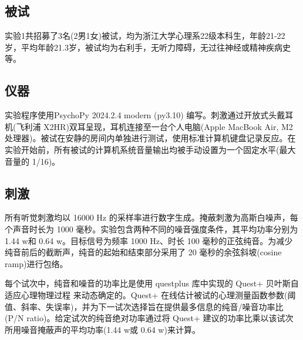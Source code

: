 \documentclass[jou,12pt,floatsintext]{apa7} %
\begin{document}
\subsection{\heiti 被试}
\vspace{-1em}

实验1共招募了3名(2男1女)被试，均为浙江大学心理系22级本科生，年龄21-22岁，平均年龄21.3岁，被试均为右利手，无听力障碍，无过往神经或精神疾病史等。

\subsection{\heiti 仪器}
\vspace{-1em}

实验程序使用PsychoPy 2024.2.4 modern (py3.10) 编写。刺激通过开放式头戴耳机(飞利浦 X2HR)双耳呈现，耳机连接至一台个人电脑(Apple MacBook Air, M2 处理器)。被试在安静的房间内单独进行测试，使用标准计算机键盘记录反应。在实验开始前，所有被试的计算机系统音量输出均被手动设置为一个固定水平(最大音量的 1/16)。




\subsection{\heiti 刺激}
\vspace{-1em}
所有听觉刺激均以 16000 Hz 的采样率进行数字生成。掩蔽刺激为高斯白噪声，每个声音时长为 1000 毫秒。实验包含两种不同的噪音强度条件，其平均功率分别为 1.44 w和 0.64 w。目标信号为频率 1000 Hz、时长 100 毫秒的正弦纯音。为减少纯音前后的截断声，纯音的起始和结束部分采用了 20 毫秒的余弦斜坡(cosine ramp)进行包络。

每个试次中，纯音和噪音的功率比是使用 questplus 库中实现的 Quest+ 贝叶斯自适应心理物理过程\parencite{watson2017quest+} 来动态确定的。Quest+ 在线估计被试的心理测量函数参数(阈值、斜率、失误率)，并为下一试次选择旨在提供最多信息的纯音/噪音功率比(P/N ratio)。给定试次的纯音绝对功率通过将 Quest+ 建议的功率比乘以该试次所用噪音掩蔽声的平均功率(1.44 w或 0.64 w)来计算。
\end{document}

